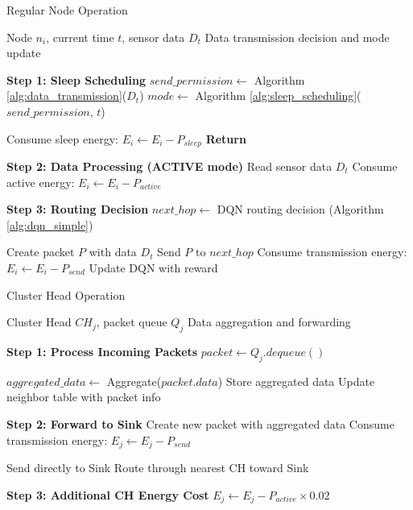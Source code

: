 \documentclass{article}
\begin{document}
\begin{algorithm}[H]
\caption{Regular Node Operation}
\label{alg:regular_node}
\begin{algorithmic}[1]

\REQUIRE Node $n_i$, current time $t$, sensor data $D_t$
\ENSURE Data transmission decision and mode update

\STATE \textbf{Step 1: Sleep Scheduling}
\STATE $send\_permission \leftarrow$ Algorithm \ref{alg:data_transmission}($D_t$)
\STATE $mode \leftarrow$ Algorithm \ref{alg:sleep_scheduling}($send\_permission$, $t$)

    \STATE Consume sleep energy: $E_i \leftarrow E_i - P_{sleep}$
    \STATE \textbf{Return} 
\ENDIF

\STATE \textbf{Step 2: Data Processing (ACTIVE mode)}
\STATE Read sensor data $D_t$
\STATE Consume active energy: $E_i \leftarrow E_i - P_{active}$

    \STATE \textbf{Step 3: Routing Decision}
    \STATE $next\_hop \leftarrow$ DQN routing decision (Algorithm \ref{alg:dqn_simple})
    
        \STATE Create packet $P$ with data $D_t$
        \STATE Send $P$ to $next\_hop$
        \STATE Consume transmission energy: $E_i \leftarrow E_i - P_{send}$
        \STATE Update DQN with reward
    \ENDIF
\ENDIF

\end{algorithmic}
\end{algorithm}

\begin{algorithm}[H]
\caption{Cluster Head Operation}
\label{alg:cluster_head}
\begin{algorithmic}[1]

\REQUIRE Cluster Head $CH_j$, packet queue $Q_j$
\ENSURE Data aggregation and forwarding

\STATE \textbf{Step 1: Process Incoming Packets}
    \STATE $packet \leftarrow Q_j.dequeue()$
    
        \STATE $aggregated\_data \leftarrow$ Aggregate($packet.data$)
        \STATE Store aggregated data
        \STATE Update neighbor table with packet info
    \ENDIF
    
    \STATE \textbf{Step 2: Forward to Sink}
    \STATE Create new packet with aggregated data
    \STATE Consume transmission energy: $E_j \leftarrow E_j - P_{send}$
    
        \STATE Send directly to Sink
    \ELSE
        \STATE Route through nearest CH toward Sink
    \ENDIF
\ENDWHILE

\STATE \textbf{Step 3: Additional CH Energy Cost}
\STATE $E_j \leftarrow E_j - P_{active} \times 0.02$ 

\end{algorithmic}
\end{algorithm}
\end{document}
